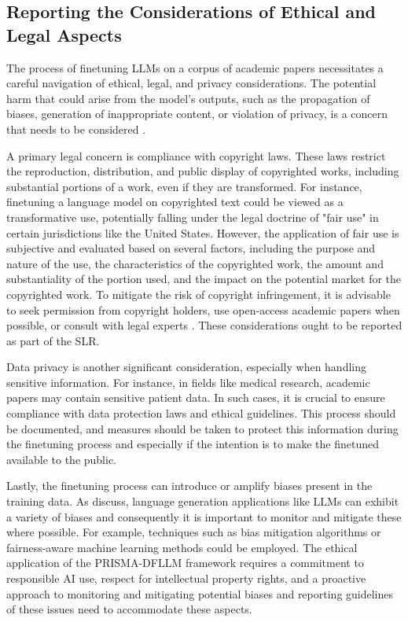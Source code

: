 \documentclass{article}
\begin{document}
\subsection{Reporting the Considerations of Ethical and Legal Aspects}

The process of finetuning LLMs on a corpus of academic papers necessitates a careful navigation of ethical, legal, and privacy considerations. The potential harm that could arise from the model's outputs, such as the propagation of biases, generation of inappropriate content, or violation of privacy, is a concern that needs to be considered \cite{sheng2021societal}. 

A primary legal concern is compliance with copyright laws. These laws restrict the reproduction, distribution, and public display of copyrighted works, including substantial portions of a work, even if they are transformed. For instance, finetuning a language model on copyrighted text could be viewed as a transformative use, potentially falling under the legal doctrine of "fair use" in certain jurisdictions like the United States. However, the application of fair use is subjective and evaluated based on several factors, including the purpose and nature of the use, the characteristics of the copyrighted work, the amount and substantiality of the portion used, and the impact on the potential market for the copyrighted work. To mitigate the risk of copyright infringement, it is advisable to seek permission from copyright holders, use open-access academic papers when possible, or consult with legal experts \cite{sheng2021societal}. These considerations ought to be reported as part of the SLR.

Data privacy is another significant consideration, especially when handling sensitive information.
For instance, in fields like medical research, academic papers may contain sensitive patient data. In such cases, it is crucial to ensure compliance with data protection laws and ethical guidelines. This process should be documented, and measures should be taken to protect this information during the finetuning process and especially if the intention is to make the finetuned available to the public. 

Lastly, the finetuning process can introduce or amplify biases present in the training data. As \citet{sheng2021societal} discuss, language generation applications like LLMs can exhibit a variety of biases and consequently it is important to monitor and mitigate these where possible. For example, techniques such as bias mitigation algorithms or fairness-aware machine learning methods could be employed. The ethical application of the PRISMA-DFLLM framework requires a commitment to responsible AI use, respect for intellectual property rights, and a proactive approach to monitoring and mitigating potential biases and reporting guidelines of these issues need to accommodate these aspects. 
\end{document}

